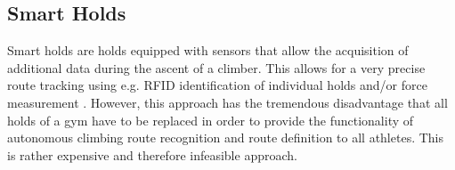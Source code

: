\subsection{Smart Holds}
Smart holds are holds equipped with sensors that allow the acquisition of additional data during the ascent of a climber. 
This allows for a very precise route tracking using e.g. RFID identification of individual holds and/or force measurement \cite{Kistler:Online, Lechner:Online}. 
However, this approach has the tremendous disadvantage that all holds of a gym have to be replaced in order to provide the functionality of autonomous climbing route recognition and route definition to all athletes. 
This is rather expensive and therefore infeasible approach.  

\iffalse
	\todo{Describe the currently existing technologies and their advantages and disadvantages. --> MARC} \\ 

	\todo{also mention the overall approach that the position tracking and matches the aggregated data against a database of existing routes}

	testciting \cite{McIntosh:2016:EPH:2858036.2858093}
\fi